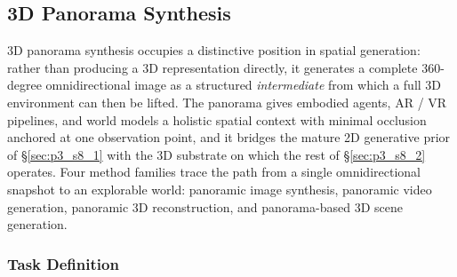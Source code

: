 
\subsection{3D Panorama Synthesis}
\label{subsec:p3_s8_2_4}

3D panorama synthesis occupies a distinctive position in spatial generation: rather than producing a 3D representation directly, it generates a complete 360-degree omnidirectional image as a structured \emph{intermediate} from which a full 3D environment can then be lifted.
The panorama gives embodied agents, AR / VR pipelines, and world models a holistic spatial context with minimal occlusion anchored at one observation point, and it bridges the mature 2D generative prior of §\ref{sec:p3_s8_1} with the 3D substrate on which the rest of §\ref{sec:p3_s8_2} operates.
Four method families trace the path from a single omnidirectional snapshot to an explorable world: panoramic image synthesis, panoramic video generation, panoramic 3D reconstruction, and panorama-based 3D scene generation.


\subsubsection{Task Definition}
\label{subsubsec:p3_s8_2_4_task}

